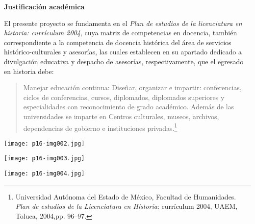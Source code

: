\begin{footnotesize}
\textbf{Justificación académica}


El presente proyecto se fundamenta en el \textit{Plan de estudios de la
licenciatura en historia: currículum 2004}, cuya matriz de competencias en
docencia, también correspondiente a la competencia de docencia histórica
del área de servicios histórico-culturales y asesorías, las cuales
establecen en su apartado dedicado a divulgación educativa y despacho de
asesorías, respectivamente, que el egresado en historia debe:

\begin{quotation}
Manejar educación continua: Diseñar, organizar e impartir: conferencias,
ciclos de conferencias, cursos, diplomados, diplomados superiores y
especialidades con reconocimiento de grado académico. Además de las
universidades se imparte en Centros culturales, museos, archivos,
dependencias de gobierno e instituciones
privadas.\footnote{Universidad Autónoma del
Estado de México, Facultad de Humanidades. \textit{Plan de estudios de la
Licenciatura en Historia}: currículum 2004, UAEM, Toluca, 2004,\linebreak  pp. 96--97.}
\end{quotation}

\vspace{3cm}
\begin{center}
\texttt{[image: p16-img002.jpg]} 
\end{center}
\newpage

\bigskip
{\centering  \texttt{[image: p16-img003.jpg]} \par}

\bigskip
{\centering\texttt{[image: p16-img004.jpg]} \par}
\end{footnotesize}
\newpage
\thispagestyle{empty}
\phantom{abc}
